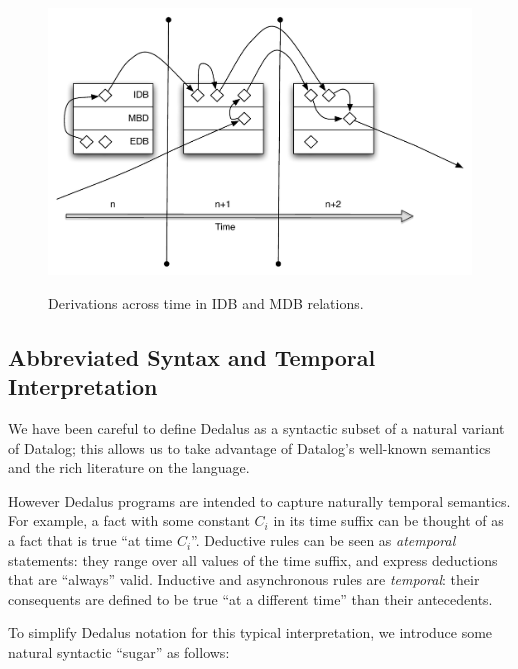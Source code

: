 \begin{figure}[t]
  \centering
  \includegraphics[width=1\linewidth]{edbidbmdb.pdf}
  \label{fig:edbidbmdb}
  \caption{Derivations across time in IDB and MDB relations.}
\vspace{-8pt}
\end{figure}




\subsection{Abbreviated Syntax and Temporal Interpretation}
We have been careful to define Dedalus as a syntactic subset of a natural variant of Datalog; this allows us to take advantage of Datalog's well-known semantics and the rich literature on the language.  

However Dedalus programs are intended to capture naturally temporal semantics.  For example, a fact with some constant $C_i$ in its time suffix can be thought of as a fact that is true ``at time $C_i$''.  Deductive rules can be seen as {\em atemporal} statements: they range over all values of the time suffix, and express deductions that are ``always'' valid.
Inductive and asynchronous rules are {\em temporal}:
their consequents are defined to be true ``at a different time'' than their antecedents. 

To simplify Dedalus notation for this typical interpretation,  we introduce some natural syntactic ``sugar'' as follows:  

